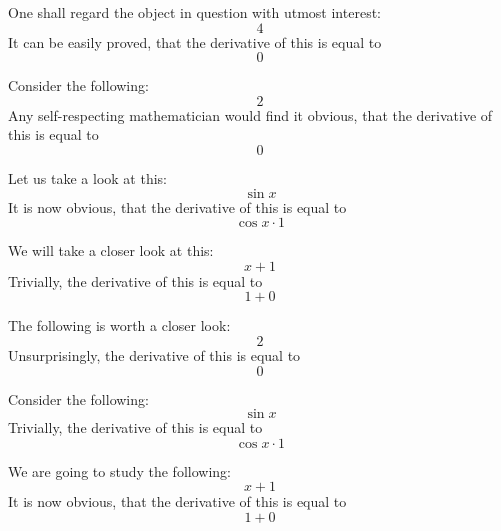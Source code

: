 \documentclass{article}
\begin{document}
One shall regard the object in question with utmost interest:
\begin{equation}
4 
\end{equation}
It can be easily proved, that the derivative of this is equal to
\begin{equation}
0 
\end{equation}

Consider the following:
\begin{equation}
2 
\end{equation}
Any self-respecting mathematician would find it obvious, that the derivative of this is equal to
\begin{equation}
0 
\end{equation}

Let us take a look at this:
\begin{equation}
\sin x 
\end{equation}
It is now obvious, that the derivative of this is equal to
\begin{equation}
\cos x \cdot 1 
\end{equation}

We will take a closer look at this:
\begin{equation}
x + 1 
\end{equation}
Trivially, the derivative of this is equal to
\begin{equation}
1 + 0 
\end{equation}

The following is worth a closer look:
\begin{equation}
2 
\end{equation}
Unsurprisingly, the derivative of this is equal to
\begin{equation}
0 
\end{equation}

Consider the following:
\begin{equation}
\sin x 
\end{equation}
Trivially, the derivative of this is equal to
\begin{equation}
\cos x \cdot 1 
\end{equation}

We are going to study the following:
\begin{equation}
x + 1 
\end{equation}
It is now obvious, that the derivative of this is equal to
\begin{equation}
1 + 0 
\end{equation}
\end{document}

